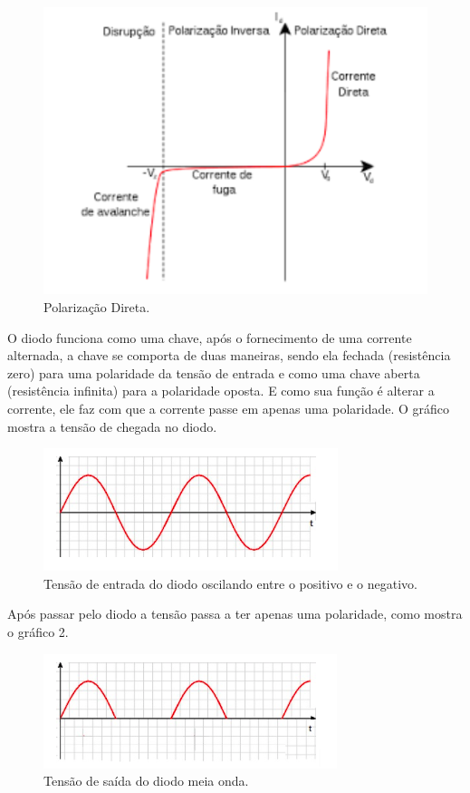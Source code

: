 \begin{figure}[!h]
	\centering
		\includegraphics[scale=0.4]{figuras/energia/8.png}
	\caption{Polarização Direta.}
\end{figure}

O diodo funciona como uma chave, após o fornecimento de uma corrente alternada, a chave se comporta de duas maneiras, sendo ela fechada (resistência zero) para uma polaridade da tensão de entrada e como uma chave aberta (resistência infinita) para a polaridade oposta. E como sua função é alterar a corrente, ele faz com que a corrente passe em apenas uma polaridade. O gráfico mostra a tensão de chegada no diodo.

\begin{figure}[!h]
	\centering
		\includegraphics[scale=0.5]{figuras/energia/9.png}
	\caption{Tensão de entrada do diodo oscilando entre o positivo e o negativo.}
\end{figure}

Após passar pelo diodo a tensão passa a ter apenas uma polaridade, como mostra o gráfico 2.

\begin{figure}[!h]
	\centering
		\includegraphics[scale=0.5]{figuras/energia/10.png}
	\caption{Tensão de saída do diodo meia onda.}
\end{figure}

